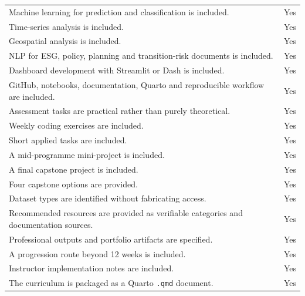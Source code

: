 \documentclass[
  a4paper,
]{article}
\begin{document}
{\begin{longtable}[]{@{}
  >{\raggedright\arraybackslash}p{}
  >{\raggedright\arraybackslash}p{}@{}}
Machine learning for prediction and classification is included. & Yes \\
Time-series analysis is included. & Yes \\
Geospatial analysis is included. & Yes \\
NLP for ESG, policy, planning and transition-risk documents is included.
& Yes \\
Dashboard development with Streamlit or Dash is included. & Yes \\
GitHub, notebooks, documentation, Quarto and reproducible workflow are
included. & Yes \\
Assessment tasks are practical rather than purely theoretical. & Yes \\
Weekly coding exercises are included. & Yes \\
Short applied tasks are included. & Yes \\
A mid-programme mini-project is included. & Yes \\
A final capstone project is included. & Yes \\
Four capstone options are provided. & Yes \\
Dataset types are identified without fabricating access. & Yes \\
Recommended resources are provided as verifiable categories and
documentation sources. & Yes \\
Professional outputs and portfolio artifacts are specified. & Yes \\
A progression route beyond 12 weeks is included. & Yes \\
Instructor implementation notes are included. & Yes \\
The curriculum is packaged as a Quarto \texttt{.qmd} document. & Yes \\
\end{longtable}
}
\end{document}
